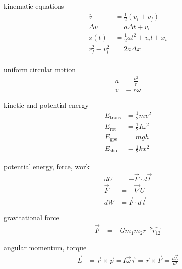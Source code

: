 \documentclass[avery5388, frame]{flashcards}
\begin{document}
\begin{flashcard}{kinematic equations}
  {\begin{align*}
    \bar{v} &= \frac{1}{2} (v_{i} + v_{f})\\
    \Delta v &= a \Delta t + v_{i}\\
    x(t) &= \frac{1}{2} a t^{2} + v_{i} t + x_{i}\\
    v_{f}^{2} - v_{i}^{2} &= 2 a \Delta x\\
  \end{align*}}
\end{flashcard}

\begin{flashcard}{uniform circular motion}
  {\begin{align*}
      a &= \frac{v^{2}}{r}\\
      v &= r \omega
  \end{align*}}
\end{flashcard}

\begin{flashcard}{kinetic and potential energy}
  {
    \begin{align*}
      E_{\textrm{trans}} &= \frac{1}{2} m v^{2}\\
      E_{\textrm{rot}} &= \frac{1}{2} I \omega^{2}\\
      E_{\textrm{gpe}} &= m g h\\
      E_{\textrm{sho}} &= \frac{1}{2} k x^{2}
    \end{align*}
  }
\end{flashcard}

\begin{flashcard}{potential energy, force, work}
  {
    \begin{align*}
       dU &= -\vec{F} \cdot d\vec{l}\\
      \vec{F} &= - \vec{\nabla} U\\
      dW &= \vec{F} \cdot d\vec{l}
    \end{align*}
  }
\end{flashcard}

\begin{flashcard}{gravitational force}
  {
    \begin{align*}
      \vec{F} &= - G m_{1} m_{2} r^{-2} \hat{r_{12}}
    \end{align*}
  }
\end{flashcard}

\begin{flashcard}{angular momentum, torque}
  {
    \begin{align*}
      \vec{L} &= \vec{r} \times \vec{p} = I \vec{\omega}
      \vec{\tau} = \vec{r} \times \vec{F} = \frac{d \vec{L}}{dt}
    \end{align*}
  }
\end{flashcard}
\end{document}
